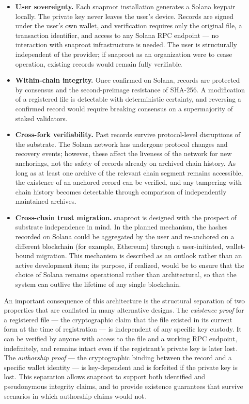 \documentclass[11pt,a4paper]{article}
\begin{document}
\begin{itemize}
\item \textbf{User sovereignty.} Each snaproot installation generates a
Solana keypair locally. The private key never leaves the user's device.
Records are signed under the user's own wallet, and verification requires
only the original file, a transaction identifier, and access to any
Solana RPC endpoint --- no interaction with snaproot infrastructure is
needed. The user is structurally independent of the provider; if snaproot
as an organization were to cease operation, existing records would remain
fully verifiable.
\item \textbf{Within-chain integrity.} Once confirmed on Solana, records
are protected by consensus and the second-preimage resistance of SHA-256.
A modification of a registered file is detectable with deterministic
certainty, and reversing a confirmed record would require breaking
consensus on a supermajority of staked validators.
\item \textbf{Cross-fork verifiability.} Past records survive
protocol-level disruptions of the substrate. The Solana network has
undergone protocol changes and recovery events; however, these affect the
liveness of the network for new anchorings, not the safety of records
already on archived chain history. As long as at least one archive of the
relevant chain segment remains accessible, the existence of an anchored
record can be verified, and any tampering with chain history becomes
detectable through comparison of independently maintained archives.
\item \textbf{Cross-chain trust migration.} snaproot is designed with
the prospect of substrate independence in mind. In the planned
mechanism, the hashes recorded on Solana could be aggregated by the
user and re-anchored on a different blockchain (for example, Ethereum)
through a user-initiated, wallet-bound migration. This mechanism is
described as an outlook rather than an active development item; its
purpose, if realized, would be to ensure that the choice of Solana
remains operational rather than architectural, so that the system can
outlive the lifetime of any single blockchain.
\end{itemize}

An important consequence of this architecture is the structural separation
of two properties that are conflated in many alternative designs. The
\emph{existence proof} for a registered file --- the cryptographic claim
that the file existed in its current form at the time of registration ---
is independent of any specific key custody. It can be verified by anyone
with access to the file and a working RPC endpoint, indefinitely, and
remains intact even if the registrant's private key is later lost. The
\emph{authorship proof} --- the cryptographic binding between the record
and a specific wallet identity --- is key-dependent and is forfeited if
the private key is lost. This separation allows snaproot to support both
identified and pseudonymous integrity claims, and to provide existence
guarantees that survive scenarios in which authorship claims would not.
\end{document}

